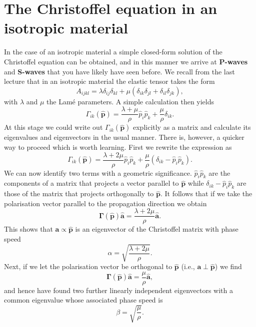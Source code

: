 \documentclass [a4paper,12pt]{paper}
\begin{document}
\section*{The Christoffel equation in an isotropic material}

In the case of an isotropic material a simple closed-form solution of the Christoffel equation can be obtained, and in this manner we arrive at \textbf{P-waves} and \textbf{S-waves} that you have likely have seen before.
 We recall from the last lecture that in an isotropic material the elastic tensor takes the form
\begin{equation}
A_{ijkl}=\lambda\delta_{ij}\delta_{kl}+\mu(\delta_{ik}\delta_{jl}+\delta_{il}\delta_{jk}),
\end{equation}
with $\lambda$ and $\mu$ the Lamé parameters. A simple calculation then yields
\begin{equation}
\Gamma_{ik}(\hat{\mathbf{p}})=\frac{\lambda+\mu}{\rho}\hat{p}_{i}\hat{p}_{k}+\frac{\mu}{\rho}\delta_{ik}.
\end{equation}
At this stage we could write out $\Gamma_{ik}(\hat{\mathbf{p}})$ explicitly as a matrix and calculate its eigenvalues and eigenvectors in the usual manner. 
There is, however, a quicker way to proceed which is worth learning. First we rewrite the expression as
\begin{equation}
\Gamma_{ik}(\hat{\mathbf{p}})=\frac{\lambda+2\mu}{\rho}\hat{p}_{i}\hat{p}_{k}+\frac{\mu}{\rho}(\delta_{ik}-\hat{p}_{i}\hat{p}_{k}).
\end{equation}
We can now identify two terms with a geometric significance. $\hat{p}_{i}\hat{p}_{k}$ are the components of a matrix that projects a vector parallel to $\hat{\mathbf{p}}$ while $\delta_{ik}-\hat{p}_{i}\hat{p}_{k}$ are those of the matrix that projects orthogonally
 to $\hat{\mathbf{p}}$. It follows that if we take the polarisation vector parallel to the propagation direction we obtain
\begin{equation}
\bm{\Gamma}(\hat{\mathbf{p}})\hat{\mathbf{a}}=\frac{\lambda+2\mu}{\rho}\hat{\mathbf{a}}.
\end{equation}
This shows that $\mathbf{a}\propto \hat{\mathbf{p}}$ is an eigenvector of the Christoffel matrix with phase speed
\begin{equation}
\alpha=\sqrt{\frac{\lambda+2\mu}{\rho}}.
\end{equation}
Next, if we let the polarisation vector be orthogonal to $\hat{\mathbf{p}}$ (i.e., $\mathbf{a}\perp \hat{\mathbf{p}}$) we find
\begin{equation}
\bm{\Gamma}(\hat{\mathbf{p}})\hat{\mathbf{a}}=\frac{\mu}{\rho}\hat{\mathbf{a}}, 
\end{equation}
and hence have found two further linearly independent eigenvectors with a common eigenvalue whose associated phase speed is
\begin{equation}
\beta=\sqrt{\frac{\mu}{\rho}}.
\end{equation}
\end{document}
